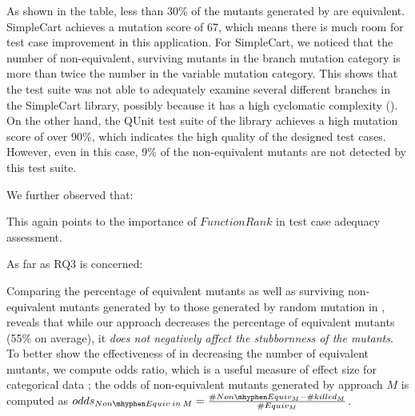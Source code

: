  As shown in the table, less than 30\% of the mutants generated by \mutandis are equivalent. 
SimpleCart achieves a mutation score of 67, which means there is much room for test case improvement in this application. 
For SimpleCart, we noticed that the number of non-equivalent, surviving mutants in the branch mutation category is more than twice the number in the variable mutation category. 
This shows that the test suite was not able to adequately examine several different branches in the SimpleCart library, possibly because it has a high cyclomatic complexity ().
On the other hand, the QUnit test suite of the \jquery library achieves a high mutation score of over 90\%, which indicates the high quality of the designed test cases. However, even in this case, 9\% of the non-equivalent mutants are not detected by this test suite.

We further observed that:


This again points to the importance of $FunctionRank$ in test case adequacy assessment. %

As far as RQ3 is concerned: 


 Comparing the percentage of equivalent mutants as well as surviving non-equivalent mutants generated by \mutandis to those generated by random mutation in , reveals that while our approach decreases the percentage of equivalent mutants (55\% on average), it \emph{does not negatively affect the stubbornness of the mutants}. To better show the effectiveness of \mutandis in decreasing the number of equivalent mutants, we compute odds ratio, which is a useful measure of effect size for categorical data \cite{madeyski:tse13}; the odds of non-equivalent mutants generated by approach $M$ is computed as 
$odds_{Non\mhyphen Equiv\: in\: M}=\frac{\#Non\mhyphen Equiv_{M}-\#killed_{M}}{\#Equiv_{M}}$.

